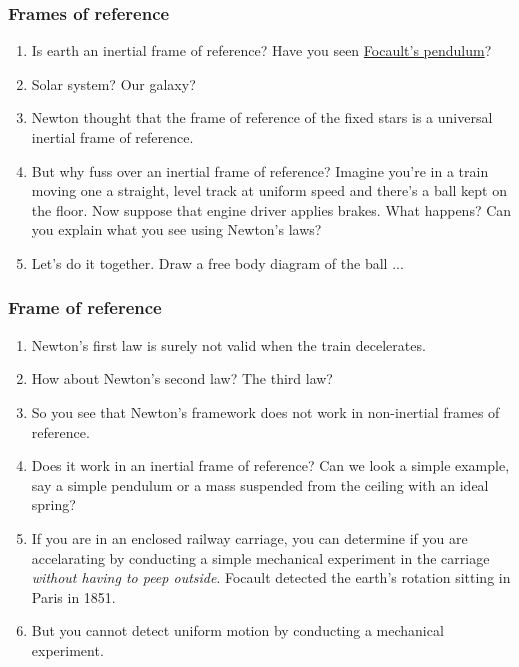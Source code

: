 \documentclass{beamer}
\begin{document}
\begin{frame}
\frametitle{Frames of reference}
\begin{enumerate}
\item Is earth an inertial frame of reference? Have you seen \href{https://en.wikipedia.org/wiki/Foucault_pendulum}{Focault's pendulum}?
\item Solar system? Our galaxy?
\item Newton thought that the frame of reference of the fixed stars is a
universal inertial frame of reference.
\item But why fuss over an inertial frame of reference? Imagine you're in a
train moving one a straight, level track at uniform speed and there's a ball
kept on the floor. Now suppose that engine driver applies brakes. What happens?
Can you explain what you see using Newton's laws?
\item Let's do it together. Draw a free body diagram of the ball ...
\end{enumerate}
\end{frame}

\begin{frame}
\frametitle{Frame of reference}
\begin{enumerate}
\item Newton's first law is surely not valid when the train decelerates.
\item How about Newton's second law? The third law?
\item So you see that Newton's framework does not work in non-inertial frames
of reference.
\item Does it work in an inertial frame of reference? Can we look a simple
example, say a simple pendulum or a mass suspended from the ceiling with an
ideal spring? 
\item If you are in an enclosed railway carriage, you can determine if you are
accelarating by conducting a simple mechanical experiment in the carriage 
\emph{without having to peep outside}. Focault detected the earth's rotation 
sitting in Paris in 1851.
\item But you cannot detect uniform motion by conducting a mechanical 
experiment.
\end{enumerate}
\end{frame}
\end{document}
